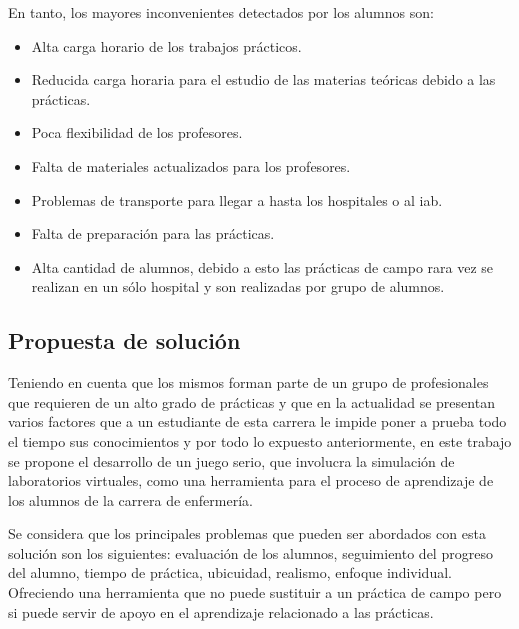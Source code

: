 En tanto, los mayores inconvenientes detectados por los alumnos son:
\begin{itemize}
\item Alta carga horario de los trabajos prácticos.
\item Reducida carga horaria para el estudio de las materias teóricas 
debido a las prácticas.
\item Poca flexibilidad de los profesores.
\item Falta de materiales actualizados para los profesores.
\item Problemas de transporte para llegar a hasta los hospitales o al 
    \gls{iab}.
\item Falta de preparación para las prácticas.
\item Alta cantidad de alumnos, debido a esto las prácticas de campo 
rara vez se realizan en un sólo hospital y son realizadas por grupo de
alumnos.
\end{itemize}

\subsection{Propuesta de solución}

Teniendo en cuenta que los mismos forman parte de un grupo de profesionales que requieren de un alto grado de prácticas y que en la actualidad se 
presentan varios factores que a un estudiante de esta carrera le impide poner 
a prueba todo el tiempo sus conocimientos y por todo lo expuesto anteriormente, en este trabajo se propone el desarrollo de un juego serio, que involucra la simulación de laboratorios virtuales, como una herramienta para 
el proceso de aprendizaje de los alumnos de la carrera de enfermería.

Se considera que los principales problemas que pueden ser abordados con esta 
solución son los siguientes: evaluación de los alumnos, seguimiento del 
progreso del alumno, tiempo de práctica, ubicuidad, realismo, enfoque 
individual. Ofreciendo una herramienta que no puede sustituir a un práctica 
de campo pero si puede servir de apoyo en el aprendizaje relacionado a las 
prácticas.
